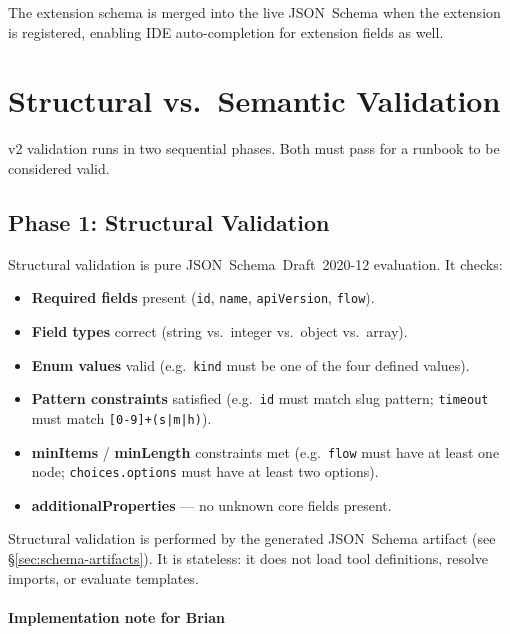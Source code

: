 The extension schema is merged into the live JSON~Schema when the extension is
registered, enabling IDE auto-completion for extension fields as well.

\section{Structural vs.\ Semantic Validation}
\label{sec:validation}

v2 validation runs in two sequential phases.  Both must pass for a runbook to
be considered valid.

\subsection{Phase 1: Structural Validation}
\label{subsec:structural}

Structural validation is pure JSON~Schema~Draft~2020-12 evaluation.  It checks:

\begin{itemize}
  \item \textbf{Required fields} present (\texttt{id}, \texttt{name},
        \texttt{apiVersion}, \texttt{flow}).
  \item \textbf{Field types} correct (string vs.\ integer vs.\ object vs.\ array).
  \item \textbf{Enum values} valid (e.g.\ \texttt{kind} must be one of the
        four defined values).
  \item \textbf{Pattern constraints} satisfied (e.g.\ \texttt{id} must match
        slug pattern; \texttt{timeout} must match \texttt{[0-9]+(s|m|h)}).
  \item \textbf{minItems} / \textbf{minLength} constraints met
        (e.g.\ \texttt{flow} must have at least one node;
        \texttt{choices.options} must have at least two options).
  \item \textbf{additionalProperties} — no unknown core fields present.
\end{itemize}

Structural validation is performed by the generated JSON~Schema artifact
(see \S\ref{sec:schema-artifacts}).  It is stateless: it does not load tool
definitions, resolve imports, or evaluate templates.

\paragraph{Implementation note for Brian}

